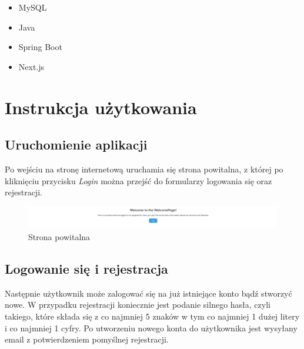 \documentclass[11pt,a4paper]{article}
\begin{document}
\begin{itemize}
    \item MySQL
    \item Java
    \item Spring Boot
    \item Next.js
\end{itemize}

\section{Instrukcja użytkowania}

\subsection{Uruchomienie aplikacji}

Po wejściu na stronę internetową uruchamia się strona powitalna, z której po kliknięciu przycisku \textit{Login} można przejść do formularzy logowania się oraz rejestracji. 

\begin{figure} [H]
    \centering
    \includegraphics[width=1\linewidth]{pages/welcome.png}
    \caption{Strona powitalna}
\end{figure}

\subsection{Logowanie się i rejestracja}

Następnie użytkownik może zalogować się na już istniejące konto bądź stworzyć nowe. W przypadku rejestracji koniecznie jest podanie silnego hasła, czyli takiego, które składa się z co najmniej 5 znaków w tym co najmniej 1 dużej litery i co najmniej 1 cyfry. Po utworzeniu nowego konta do użytkownika jest wysyłany email z potwierdzeniem pomyślnej rejestracji.
\end{document}
